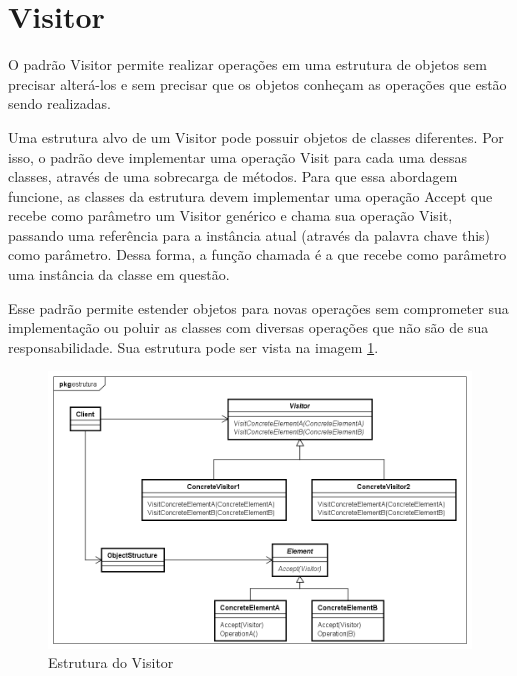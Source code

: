 \section{Visitor}

O padrão Visitor permite realizar 
operações em uma estrutura de objetos sem precisar alterá-los 
e sem precisar que os objetos conheçam as 
operações que estão sendo realizadas. \cite{gamma:1995}

Uma estrutura alvo de um Visitor pode possuir objetos de 
classes diferentes. Por isso, o padrão deve implementar 
uma operação Visit para cada uma dessas classes, 
através de uma sobrecarga de métodos. Para que essa 
abordagem funcione, as classes da estrutura devem implementar 
uma operação Accept que recebe como parâmetro um 
Visitor genérico e chama sua operação Visit, 
passando uma referência para a instância atual 
(através da palavra chave this) 
como parâmetro. Dessa forma, a função chamada é a 
que recebe como parâmetro uma instância da 
classe em questão.

Esse padrão permite estender objetos para novas operações 
sem comprometer sua implementação ou poluir as classes com 
diversas operações que não são de sua responsabilidade. 
Sua estrutura pode ser vista na imagem \ref{visitor_struct}.

\begin{figure}[htb]
	\caption{\label{visitor_struct}Estrutura do Visitor}
	\begin{center}
	    \includegraphics[scale=0.5]{5_padroes-contexto-funcional/5.3_comportamentais/5.3.11_visitor/visitor_estrutura.png}
	\end{center}
\end{figure}


